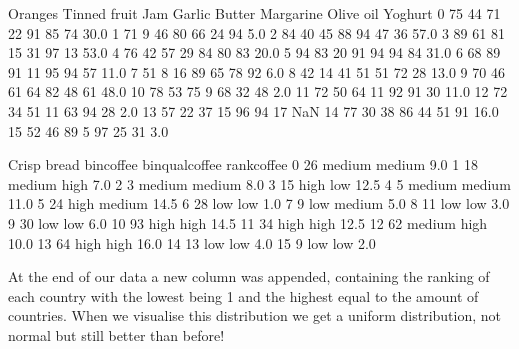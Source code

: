 \documentclass[letterpaper,10pt,english]{jupyterBook}
\begin{document}
\begin{sphinxVerbatim}[commandchars=\\\{\}]
    Oranges  Tinned fruit  Jam  Garlic  Butter  Margarine  Olive oil  Yoghurt  \PYGZbs{}
0        75            44   71      22      91         85         74     30.0   
1        71             9   46      80      66         24         94      5.0   
2        84            40   45      88      94         47         36     57.0   
3        89            61   81      15      31         97         13     53.0   
4        76            42   57      29      84         80         83     20.0   
5        94            83   20      91      94         94         84     31.0   
6        68            89   91      11      95         94         57     11.0   
7        51             8   16      89      65         78         92      6.0   
8        42            14   41      51      51         72         28     13.0   
9        70            46   61      64      82         48         61     48.0   
10       78            53   75       9      68         32         48      2.0   
11       72            50   64      11      92         91         30     11.0   
12       72            34   51      11      63         94         28      2.0   
13       57            22   37      15      96         94         17      NaN   
14       77            30   38      86      44         51         91     16.0   
15       52            46   89       5      97         25         31      3.0   

    Crisp bread bin\PYGZus{}coffee bin\PYGZus{}qual\PYGZus{}coffee  rank\PYGZus{}coffee  
0            26     medium          medium          9.0  
1            18     medium            high          7.0  
2             3     medium          medium          8.0  
3            15       high             low         12.5  
4             5     medium          medium         11.0  
5            24       high          medium         14.5  
6            28        low             low          1.0  
7             9        low          medium          5.0  
8            11        low             low          3.0  
9            30        low             low          6.0  
10           93       high            high         14.5  
11           34       high            high         12.5  
12           62     medium            high         10.0  
13           64       high            high         16.0  
14           13        low             low          4.0  
15            9        low             low          2.0  
\end{sphinxVerbatim}

\sphinxAtStartPar
At the end of our data a new column was appended, containing the ranking of each country with the lowest being 1 and the highest equal to the amount of countries.
When we visualise this distribution we get a uniform distribution, not normal but still better than before!
\end{document}
